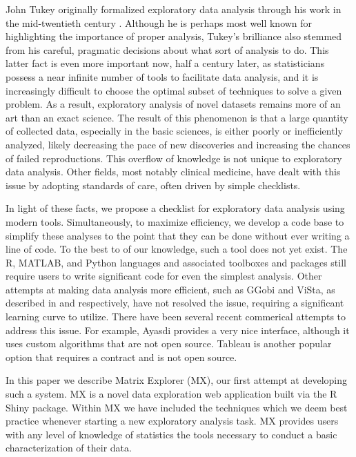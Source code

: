 \documentclass[twoside,leqno,twocolumn]{article}
\begin{document}
John Tukey originally formalized exploratory data analysis through his work in the mid-twentieth century \cite{tukey1962future}. Although he is perhaps most well known for highlighting the importance of proper analysis, Tukey's brilliance also stemmed from his careful, pragmatic decisions about what sort of analysis to do. This latter fact is even more important now, half a century later, as statisticians possess a near infinite number of tools to facilitate data analysis, and it is increasingly difficult to choose the optimal subset of techniques to solve a given problem. As a result, exploratory analysis of novel datasets remains more of an art than an exact science. The result of this phenomenon is that a large quantity of collected data, especially in the basic sciences, is either poorly or inefficiently analyzed, likely decreasing the pace of new discoveries and increasing the chances of failed reproductions. This overflow of knowledge is not unique to exploratory data analysis. Other fields, most notably clinical medicine, have dealt with this issue by adopting standards of care, often driven by simple checklists. 

In light of these facts, we propose a checklist for exploratory data analysis using modern tools. Simultaneously, to maximize efficiency, we develop a code base to simplify these analyses to the point that they can be done without ever writing a line of code. To the best to of our knowledge, such a tool does not yet exist. The R, MATLAB, and Python languages and associated toolboxes and packages still require users to write significant code for even the simplest analysis. Other attempts at making data analysis more efficient, such as GGobi and ViSta, as described in \cite{swayne2003ggobi} and \cite{valero2011using} respectively, have not resolved the issue, requiring a significant learning curve to utilize. There have been several recent commerical attempts to address this issue. For example, Ayasdi provides a very nice interface, although it uses custom algorithms that are not open source. Tableau is another popular option that requires a contract and is not open source. 

In this paper we describe Matrix Explorer (MX), our first attempt at developing such a system. MX is a novel data exploration web application built via the R Shiny package. Within MX we have included the techniques which we deem best practice whenever starting a new exploratory analysis task. MX provides users with any level of knowledge of statistics the tools necessary to conduct a basic characterization of their data.
\end{document}
